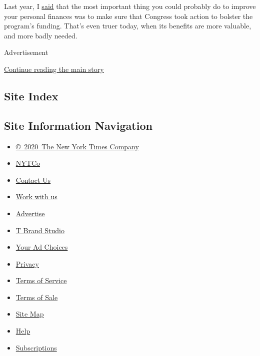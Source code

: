 Last year, I
\href{https://www.nytimes3xbfgragh.onion/2019/06/21/your-money/social-security.html}{said}
that the most important thing you could probably do to improve your
personal finances was to make sure that Congress took action to bolster
the program's funding. That's even truer today, when its benefits are
more valuable, and more badly needed.

Advertisement

\protect\hyperlink{after-bottom}{Continue reading the main story}

\hypertarget{site-index}{%
\subsection{Site Index}\label{site-index}}

\hypertarget{site-information-navigation}{%
\subsection{Site Information
Navigation}\label{site-information-navigation}}

\begin{itemize}
\tightlist
\item
  \href{https://help.nytimes3xbfgragh.onion/hc/en-us/articles/115014792127-Copyright-notice}{©~2020~The
  New York Times Company}
\end{itemize}

\begin{itemize}
\tightlist
\item
  \href{https://www.nytco.com/}{NYTCo}
\item
  \href{https://help.nytimes3xbfgragh.onion/hc/en-us/articles/115015385887-Contact-Us}{Contact
  Us}
\item
  \href{https://www.nytco.com/careers/}{Work with us}
\item
  \href{https://nytmediakit.com/}{Advertise}
\item
  \href{http://www.tbrandstudio.com/}{T Brand Studio}
\item
  \href{https://www.nytimes3xbfgragh.onion/privacy/cookie-policy\#how-do-i-manage-trackers}{Your
  Ad Choices}
\item
  \href{https://www.nytimes3xbfgragh.onion/privacy}{Privacy}
\item
  \href{https://help.nytimes3xbfgragh.onion/hc/en-us/articles/115014893428-Terms-of-service}{Terms
  of Service}
\item
  \href{https://help.nytimes3xbfgragh.onion/hc/en-us/articles/115014893968-Terms-of-sale}{Terms
  of Sale}
\item
  \href{https://spiderbites.nytimes3xbfgragh.onion}{Site Map}
\item
  \href{https://help.nytimes3xbfgragh.onion/hc/en-us}{Help}
\item
  \href{https://www.nytimes3xbfgragh.onion/subscription?campaignId=37WXW}{Subscriptions}
\end{itemize}
